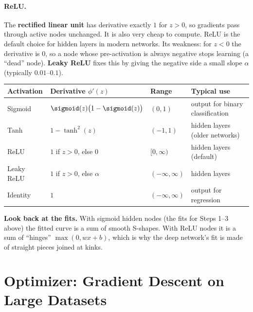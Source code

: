 \documentclass[12pt, a4paper]{article}
\begin{document}
\paragraph{ReLU.}
The \textbf{rectified linear unit} has derivative exactly $1$ for $z > 0$, so
gradients pass through active nodes unchanged. It is also very cheap to
compute. ReLU is the default choice for hidden layers in modern networks.
Its weakness: for $z < 0$ the derivative is $0$, so a node whose
pre-activation is always negative stops learning (a ``dead'' node).
\textbf{Leaky ReLU} fixes this by giving the negative side a small slope
$\alpha$ (typically $0.01$--$0.1$).

\begin{center}
  \renewcommand{\arraystretch}{1.3}
  \begin{tabular}{llll}
    \toprule
    Activation & Derivative $\phi'(z)$                  & Range              & Typical use                      \\
    \midrule
    Sigmoid    & $\sigmoid(z)\bigl(1-\sigmoid(z)\bigr)$ & $(0,1)$            & output for binary classification \\
    Tanh       & $1 - \tanh^2(z)$                       & $(-1,1)$           & hidden layers (older networks)   \\
    ReLU       & $1$ if $z>0$, else $0$                 & $[0,\infty)$       & hidden layers (default)          \\
    Leaky ReLU & $1$ if $z>0$, else $\alpha$            & $(-\infty,\infty)$ & hidden layers                    \\
    Identity   & $1$                                    & $(-\infty,\infty)$ & output for regression            \\
    \bottomrule
  \end{tabular}
\end{center}

\begin{notebox}
  \textbf{Look back at the fits.} With sigmoid hidden nodes
  (the fits for Steps 1--3 above) the fitted curve is a sum of
  smooth S-shapes. With ReLU nodes it is a sum of ``hinges'' $\max(0, wx+b)$,
  which is why the deep network's fit is made of straight pieces joined at
  kinks.
\end{notebox}

\section{Optimizer: Gradient Descent on Large Datasets}
\end{document}
